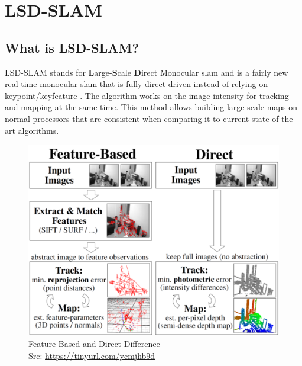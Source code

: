 
\chapter{LSD-SLAM\authorA}\label{ref:lsdslam}

\section{What is LSD-SLAM?}
LSD-SLAM stands for \textbf{L}arge-\textbf{S}cale \textbf{D}irect Monocular \gls{slam} and is a fairly new real-time monocular \gls{slam} that is fully direct-driven instead of relying on keypoint/keyfeature \cite{lsdslam_eccv}. The algorithm works on the image intensity for tracking and mapping at the same time.\newline
This method allows building large-scale maps on normal processors that are consistent when comparing it to current state-of-the-art algorithms. \newline
\begin{figure}[h]
	\centering
	\includegraphics[height=0.5\textwidth]{./media/images/direct-vs-feature-based.png}
  	\caption{Feature-Based and Direct Difference
  	\\Src: \url{https://tinyurl.com/ycmjhb9d}}
  	\label{featurebased_direct_difference}
\end{figure}

